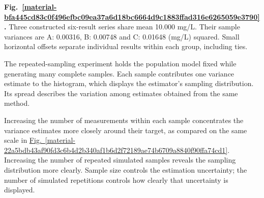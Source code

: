\documentclass[11pt,a4paper]{article}
\begin{document}
\par\medskip
\Needspace{10cm}
\label{material-bfa445cd83c0f496efbc09ea37a6d18bc6664d9c1883ffad316e6265059e3790}
\noindent\textbf{Fig.~\ref*{material-bfa445cd83c0f496efbc09ea37a6d18bc6664d9c1883ffad316e6265059e3790}.} Three constructed six-result series share mean 10.000 mg/L. Their sample variances are A: 0.00316, B: 0.00748 and C: 0.01648 (mg/L) squared. Small horizontal offsets separate individual results within each group, including ties.\par\nopagebreak
\begin{center}
\end{center}


\medskip

The repeated-sampling experiment holds the population model fixed while generating many complete samples. Each sample contributes one variance estimate to the histogram, which displays the estimator's sampling distribution. Its spread describes the variation among estimates obtained from the same method.


Increasing the number of measurements within each sample concentrates the variance estimates more closely around their target, as compared on the same scale in \hyperref[material-22a5bdb43af90fd3c6b4d2b340af1b6d2f72189ae74b6709a8840f90ffa74cd1]{Fig.~\ref*{material-22a5bdb43af90fd3c6b4d2b340af1b6d2f72189ae74b6709a8840f90ffa74cd1}}. Increasing the number of repeated simulated samples reveals the sampling distribution more clearly. Sample size controls the estimation uncertainty; the number of simulated repetitions controls how clearly that uncertainty is displayed.
\end{document}
